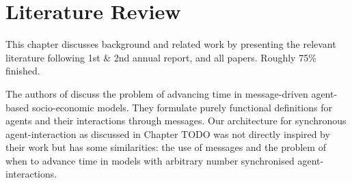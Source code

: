 \chapter{Literature Review}
This chapter discusses background and related work by presenting the relevant literature
following 1st \& 2nd annual report, and all papers.
Roughly 75\% finished.

The authors of \cite{botta_time_2010} discuss the problem of advancing time in message-driven agent-based socio-economic models. They formulate purely functional definitions for agents and their interactions through messages. Our architecture for synchronous agent-interaction as discussed in Chapter TODO was not directly inspired by their work but has some similarities: the use of messages and the problem of when to advance time in models with arbitrary number synchronised agent-interactions.